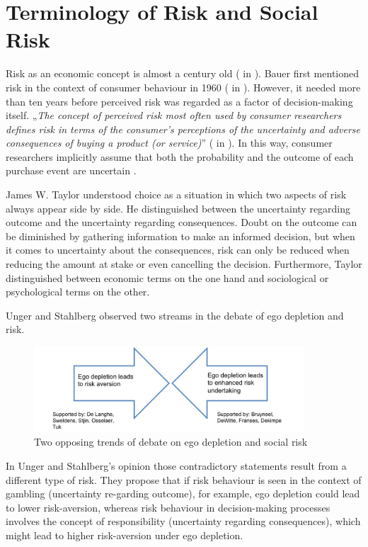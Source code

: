 \section{Terminology of Risk and Social Risk}
Risk as an economic concept is almost a century old (\cite{knight1921risk} in \cite{dowling1994model}). Bauer first mentioned risk in the context of consumer behaviour in 1960 (\cite{bauer1960consumer} in \cite{ross1975perceived}). However, it needed more than ten years before perceived risk was regarded as a factor of decision-making itself. „\emph{The concept of perceived risk most often used by consumer researchers defines risk in terms of the consumer's perceptions of the uncertainty and adverse consequences of buying a product (or service)}” (\cite{engel1973blackwell} in \cite{ross1975perceived}). In this way, consumer researchers implicitly assume that both the probability and the outcome of each purchase event are uncertain \citep{dowling1994model}.\par
James W. Taylor \citep{taylor1974role} understood choice as a situation in which two aspects of risk always appear side by side. He distinguished between the uncertainty regarding outcome and the uncertainty regarding consequences. Doubt on the outcome can be diminished by gathering information to make an informed decision, but when it comes to uncertainty about the consequences, risk can only be reduced when reducing the amount at stake or even cancelling the decision. Furthermore, Taylor distinguished between economic terms on the one hand and sociological or psychological terms on the other.\par
Unger and Stahlberg \citep{unger2011ego} observed two streams in the debate of ego depletion and risk. 
\begin{figure}[h!]
\center
	\includegraphics[width=0.9\textwidth]{images/twostreams.png}
  \caption{Two opposing trends of debate on ego depletion and social risk \citep{unger2011ego}} \label{fig:twostreams}
\end{figure}
In Unger and Stahlberg’s opinion those contradictory statements result from a different type of risk. They propose that if risk behaviour is seen in the context of gambling (uncertainty re-garding outcome), for example, ego depletion could lead to lower risk-aversion, whereas risk behaviour in decision-making processes involves the concept of responsibility (uncertainty regarding consequences), which might lead to higher risk-aversion under ego depletion. \par

